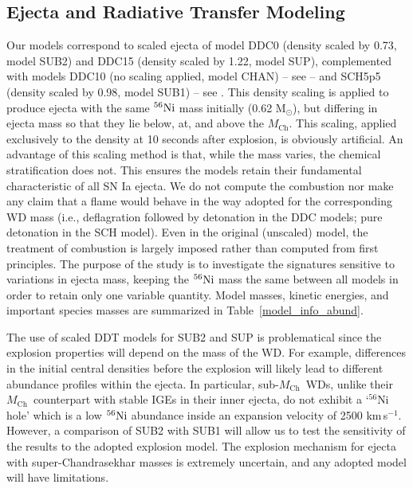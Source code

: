 \documentclass[useAMS,usenatbib,useasmath]{mnras}
\newcommand{\Mch}{\hbox{$M_{\text{Ch}}$}}
\newcommand{\Msun}{\hbox{M$_\odot$}}
\newcommand{\kms}{\hbox{km$\,$s$^{-1}$}}
\newcommand{\elem}[2][default]{$^{#1}{\rm #2}$}
\begin{document}
\subsection{Ejecta and Radiative Transfer Modeling} 
Our models correspond to scaled ejecta of model DDC0 (density scaled by 0.73, model SUB2) and DDC15 (density scaled by 1.22, model SUP), complemented with models DDC10 (no scaling applied, model CHAN) -- see \cite{Blondin2013} -- and SCH5p5 (density scaled by 0.98, model SUB1) -- see \cite{Blondin2017}. This density scaling is applied to produce ejecta with the same \elem[56]{Ni} mass initially (0.62 \Msun), but differing in ejecta mass so that they lie below, at, and above the \Mch. This scaling, applied exclusively to the density at 10 seconds after explosion, is obviously artificial. An advantage of this scaling method is that, while the mass varies, the chemical stratification does not. This ensures the models retain their fundamental characteristic of all SN Ia ejecta. We do not compute the combustion nor make any claim that a flame would behave in the way adopted for the corresponding WD mass (i.e., deflagration followed by detonation in the DDC models; pure detonation in the SCH model). Even in the original (unscaled) model, the treatment of combustion is largely imposed rather than computed from first principles. The purpose of the study is to investigate the signatures sensitive to variations in ejecta mass, keeping the \elem[56]{Ni} mass the same between all models in order to retain only one variable quantity. Model masses, kinetic energies, and important species masses are summarized in Table~\ref{model_info_abund}.  

The use of scaled DDT models for SUB2 and SUP is problematical since the explosion properties will depend on the mass of the WD. For example, differences in the initial central densities before  the explosion will likely lead to different abundance profiles within the ejecta. In particular, sub-\Mch\ WDs, unlike their \Mch\ counterpart with stable IGEs in their inner ejecta, do not exhibit a `$^{56}$Ni hole' which is a low \elem[56]{Ni} abundance inside an expansion velocity of 2500 \kms. However, a comparison of SUB2 with SUB1 will allow us to test the sensitivity of the results to the adopted explosion model. The explosion mechanism for ejecta with super-Chandrasekhar masses is extremely uncertain, and any adopted model will have limitations.
\end{document}
